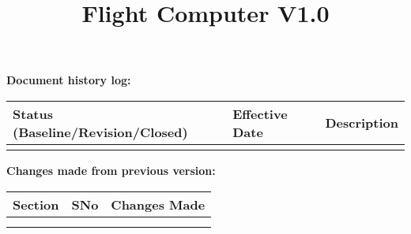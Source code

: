 \documentclass[10pt,a4paper]{article} %
\title{ Flight Computer V1.0}
\begin{document}
	\maketitle
	\thispagestyle{fancy}
	\newpage
	\tableofcontents
	\newpage
	\textbf{Document history log:}		
	\begin{center}
		
		\begin{tabular}{|p{5.5cm}|p{5cm}|p{5cm}|}
			\hline
			\textbf{Status (Baseline/Revision/Closed)} & \textbf{Effective Date} & \textbf{Description}\\
			\hline
			&   &  \\
			\hline
		\end{tabular}
	\end{center}
	
	
	\begin{center}
			
	\begin{table}[b]
		\textbf{Changes made from previous version:} \\
		\begin{tabular}{|p{5 cm}|p{2cm}|p{8cm}|}
			\hline
			\textbf{Section} & \textbf{SNo} & \textbf{Changes Made}\\
			\hline
		 &  &  \\
			\hline
		 & &  \\
			\hline
		\end{tabular}
	\end{table}
	\end{center}
	
	
\end{document}
